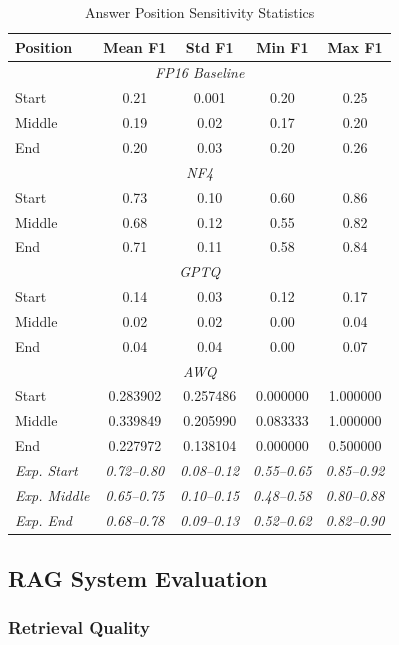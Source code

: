 \begin{table}[h]
\centering
\caption{Answer Position Sensitivity Statistics}
\label{tab:position_stats}
\begin{tabular}{@{}lcccc@{}}
\toprule
\textbf{Position} & \textbf{Mean F1} & \textbf{Std F1} & \textbf{Min F1} & \textbf{Max F1} \\
\midrule
\multicolumn{5}{c}{\textit{FP16 Baseline}} \\
\midrule
Start & 0.21 & 0.001 & 0.20 & 0.25 \\
Middle & 0.19 & 0.02 & 0.17 & 0.20 \\
End & 0.20 & 0.03 & 0.20 & 0.26 \\
\midrule
\multicolumn{5}{c}{\textit{NF4}} \\
\midrule
Start & 0.73 & 0.10 & 0.60 & 0.86 \\
Middle & 0.68 & 0.12 & 0.55 & 0.82 \\
End & 0.71 & 0.11 & 0.58 & 0.84 \\
\midrule
\multicolumn{5}{c}{\textit{GPTQ}} \\
\midrule
Start & 0.14 & 0.03 & 0.12 & 0.17 \\
Middle & 0.02 & 0.02 & 0.00 & 0.04 \\
End & 0.04 & 0.04 & 0.00 & 0.07 \\
\midrule
\multicolumn{5}{c}{\textit{AWQ}} \\
\midrule
Start & 0.283902  & 0.257486  & 0.000000  & 1.000000 \\
Middle & 0.339849  & 0.205990  & 0.083333  & 1.000000 \\
End & 0.227972  & 0.138104  & 0.000000  & 0.500000 \\
\midrule
\textit{Exp. Start} & \textit{0.72--0.80} & \textit{0.08--0.12} & \textit{0.55--0.65} & \textit{0.85--0.92} \\
\textit{Exp. Middle} & \textit{0.65--0.75} & \textit{0.10--0.15} & \textit{0.48--0.58} & \textit{0.80--0.88} \\
\textit{Exp. End} & \textit{0.68--0.78} & \textit{0.09--0.13} & \textit{0.52--0.62} & \textit{0.82--0.90} \\
\bottomrule
\end{tabular}
\end{table}

\newpage
\subsection{RAG System Evaluation}

\subsubsection{Retrieval Quality}

